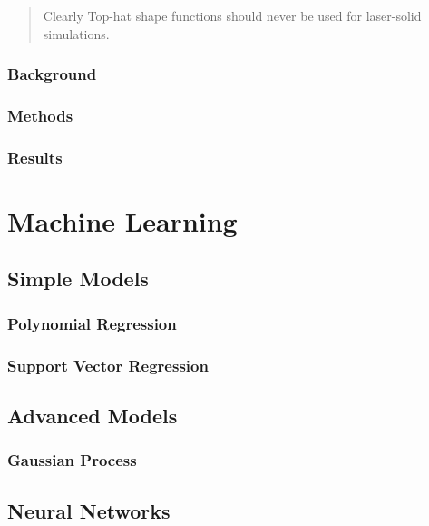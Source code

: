 \begin{quote}
	Clearly Top-hat shape functions should never be used for laser-solid simulations.
\end{quote}

\subsubsection{Background}

\subsubsection{Methods}

\subsubsection{Results}

\section{Machine Learning}

\subsection{Simple Models}

\subsubsection{Polynomial Regression}

\subsubsection{Support Vector Regression}


\subsection{Advanced Models}

\subsubsection{Gaussian Process}

\subsection{Neural Networks}